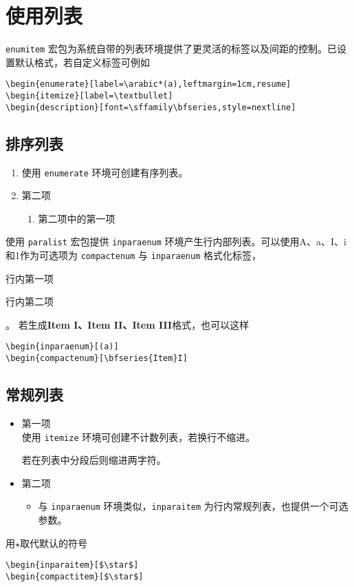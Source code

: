 \clearpage
\section{使用列表}
\lstinline{enumitem} 宏包为系统自带的列表环境提供了更灵活的标签以及间距的控制。已设置默认格式，若自定义标签可例如
\begin{lstlisting}[numbers=none]
\begin{enumerate}[label=\arabic*(a),leftmargin=1cm,resume]
\begin{itemize}[label=\textbullet]
\begin{description}[font=\sffamily\bfseries,style=nextline]
\end{lstlisting}

\subsection{排序列表}
\begin{enumerate}
\item 使用 \lstinline{enumerate} 环境可创建有序列表。
\item 第二项
	\begin{enumerate}
	\item 第二项中的第一项
	\end{enumerate}
\end{enumerate}
使用 \lstinline{paralist} 宏包提供 \lstinline{inparaenum} 环境产生行内部列表。可以使用\textsf{A、a、I、i和1}作为可选项为 \lstinline{compactenum} 与 \lstinline{inparaenum} 格式化标签，
\begin{inparaenum}[(a)]
\item 行内第一项
\item 行内第二项
\end{inparaenum}。
若生成\textbf{Item I、Item II、Item III}格式，也可以这样
\begin{lstlisting}[numbers=none]
\begin{inparaenum}[(a)]
\begin{compactenum}[\bfseries{Item}I]
\end{lstlisting}

\subsection{常规列表}
\begin{itemize}
\item 第一项\\
使用 \lstinline{itemize} 环境可创建不计数列表，若换行不缩进。\par
若在列表中分段后则缩进两字符。
\item 第二项
	\begin{itemize}
	\item 与 \lstinline{inparaenum} 环境类似，\lstinline{inparaitem} 为行内常规列表，也提供一个可选参数。
	\end{itemize}
\end{itemize}
用$\star$取代默认的符号
\begin{lstlisting}[numbers=none]
\begin{inparaitem}[$\star$]
\begin{compactitem}[$\star$]
\end{lstlisting}


